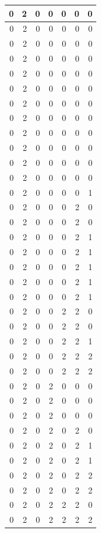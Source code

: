 \documentclass[
  12pt,
]{krantz}
\begin{document}
\begin{tabular}{r|r|r|r|r|r|r}
\hline
0 & 2 & 0 & 0 & 0 & 0 & 0\\
\hline
0 & 2 & 0 & 0 & 0 & 0 & 0\\
\hline
0 & 2 & 0 & 0 & 0 & 0 & 0\\
\hline
0 & 2 & 0 & 0 & 0 & 0 & 0\\
\hline
0 & 2 & 0 & 0 & 0 & 0 & 0\\
\hline
0 & 2 & 0 & 0 & 0 & 0 & 0\\
\hline
0 & 2 & 0 & 0 & 0 & 0 & 0\\
\hline
0 & 2 & 0 & 0 & 0 & 0 & 0\\
\hline
0 & 2 & 0 & 0 & 0 & 0 & 0\\
\hline
0 & 2 & 0 & 0 & 0 & 0 & 0\\
\hline
0 & 2 & 0 & 0 & 0 & 0 & 0\\
\hline
0 & 2 & 0 & 0 & 0 & 0 & 0\\
\hline
0 & 2 & 0 & 0 & 0 & 0 & 1\\
\hline
0 & 2 & 0 & 0 & 0 & 2 & 0\\
\hline
0 & 2 & 0 & 0 & 0 & 2 & 0\\
\hline
0 & 2 & 0 & 0 & 0 & 2 & 1\\
\hline
0 & 2 & 0 & 0 & 0 & 2 & 1\\
\hline
0 & 2 & 0 & 0 & 0 & 2 & 1\\
\hline
0 & 2 & 0 & 0 & 0 & 2 & 1\\
\hline
0 & 2 & 0 & 0 & 0 & 2 & 1\\
\hline
0 & 2 & 0 & 0 & 2 & 2 & 0\\
\hline
0 & 2 & 0 & 0 & 2 & 2 & 0\\
\hline
0 & 2 & 0 & 0 & 2 & 2 & 1\\
\hline
0 & 2 & 0 & 0 & 2 & 2 & 2\\
\hline
0 & 2 & 0 & 0 & 2 & 2 & 2\\
\hline
0 & 2 & 0 & 2 & 0 & 0 & 0\\
\hline
0 & 2 & 0 & 2 & 0 & 0 & 0\\
\hline
0 & 2 & 0 & 2 & 0 & 0 & 0\\
\hline
0 & 2 & 0 & 2 & 0 & 2 & 0\\
\hline
0 & 2 & 0 & 2 & 0 & 2 & 1\\
\hline
0 & 2 & 0 & 2 & 0 & 2 & 1\\
\hline
0 & 2 & 0 & 2 & 0 & 2 & 2\\
\hline
0 & 2 & 0 & 2 & 0 & 2 & 2\\
\hline
0 & 2 & 0 & 2 & 2 & 2 & 0\\
\hline
0 & 2 & 0 & 2 & 2 & 2 & 2\\

\end{tabular}
\end{document}
